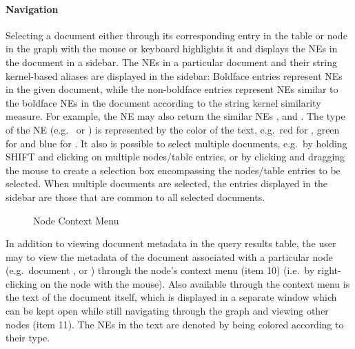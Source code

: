 \paragraph{Navigation}
Selecting a document either through its corresponding entry in the table or node in the graph with the mouse or keyboard highlights it and displays the NEs in the document in a sidebar. The NEs in a particular document and their string kernel-based aliases are displayed in the sidebar: Boldface entries represent NEs in the given document, while the non-boldface entries represent NEs similar to the boldface NEs in the document according to the string kernel similarity measure. For example, the NE \textbf{} may also return the similar NEs ,  and . The type of the NE (e.g.\  or ) is represented by the color of the text, e.g.\ red for , green for  and blue for . It also is possible to select multiple documents, e.g.\ by holding SHIFT and clicking on multiple nodes/table entries, or by clicking and dragging the mouse to create a selection box encompassing the nodes/table entries to be selected. When multiple documents are selected, the entries displayed in the sidebar are those that are common to all selected documents.

\begin{figure}[ht]
\centering
\caption{Node Context Menu}
\end{figure}

In addition to viewing document metadata in the query results table, the user may to view the metadata of the document associated with a particular node (e.g.\ document ,  or ) through the node's context menu (item 10) (i.e.\ by right-clicking on the node with the mouse). Also available through the context menu is the text of the document itself, which is displayed in a separate window which can be kept open while still navigating through the graph and viewing other nodes (item 11). The NEs in the text are denoted by being colored according to their type.

